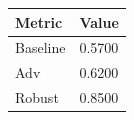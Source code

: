 \begin{tabular}{ll}
\toprule
Metric & Value \\
\midrule
Baseline & 0.5700 \\
Adv & 0.6200 \\
Robust & 0.8500 \\
\bottomrule
\end{tabular}